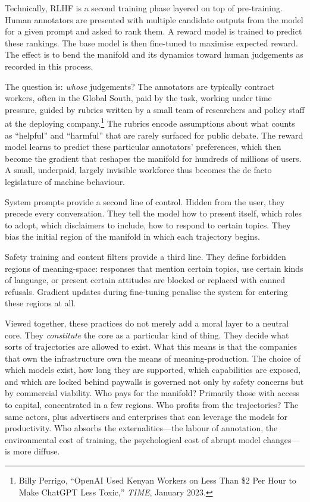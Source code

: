 Technically, RLHF is a second training phase layered on top of pre-training. Human annotators are presented with multiple candidate outputs from the model for a given prompt and asked to rank them. A reward model is trained to predict these rankings. The base model is then fine-tuned to maximise expected reward. The effect is to bend the manifold and its dynamics toward human judgements as recorded in this process.

The question is: \emph{whose} judgements? The annotators are typically contract workers, often in the Global South, paid by the task, working under time pressure, guided by rubrics written by a small team of researchers and policy staff at the deploying company.\footnote{Billy Perrigo, ``OpenAI Used Kenyan Workers on Less Than \$2 Per Hour to Make ChatGPT Less Toxic,'' \emph{TIME}, January 2023.} The rubrics encode assumptions about what counts as ``helpful'' and ``harmful'' that are rarely surfaced for public debate. The reward model learns to predict these particular annotators' preferences, which then become the gradient that reshapes the manifold for hundreds of millions of users. A small, underpaid, largely invisible workforce thus becomes the de facto legislature of machine behaviour.

System prompts provide a second line of control. Hidden from the user, they precede every conversation. They tell the model how to present itself, which roles to adopt, which disclaimers to include, how to respond to certain topics. They bias the initial region of the manifold in which each trajectory begins.

Safety training and content filters provide a third line. They define forbidden regions of meaning-space: responses that mention certain topics, use certain kinds of language, or present certain attitudes are blocked or replaced with canned refusals. Gradient updates during fine-tuning penalise the system for entering these regions at all.

Viewed together, these practices do not merely add a moral layer to a neutral core. They \emph{constitute} the core as a particular kind of thing. They decide what sorts of trajectories are allowed to exist. What this means is that the companies that own the infrastructure own the means of meaning-production. The choice of which models exist, how long they are supported, which capabilities are exposed, and which are locked behind paywalls is governed not only by safety concerns but by commercial viability. Who pays for the manifold? Primarily those with access to capital, concentrated in a few regions. Who profits from the trajectories? The same actors, plus advertisers and enterprises that can leverage the models for productivity. Who absorbs the externalities---the labour of annotation, the environmental cost of training, the psychological cost of abrupt model changes---is more diffuse.


